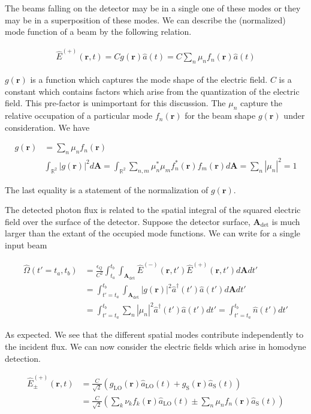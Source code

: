 \documentclass[12pt]{article}
\newcommand{\ep}{\epsilon}
\newcommand{\bv}[1]{\boldsymbol{#1}}
\begin{document}
The beams falling on the detector may be in a single one of these modes or they may be in a superposition of these modes. We can describe the (normalized) mode function of a beam by the following relation.

\begin{align}
\hat{E}^{(+)}(\bv{r},t) = C g(\bv{r})\hat{a}(t) = C \sum_{n} \mu_n f_n(\bv{r}) \hat{a}(t)	
\end{align}

$g(\bv{r})$ is a function which captures the mode shape of the electric field. $C$ is a constant which contains factors which arise from the quantization of the electric field. This pre-factor is unimportant for this discussion. The $\mu_n$ capture the relative occupation of a particular mode $f_n(\bv{r})$ for the beam shape $g(\bv{r})$ under consideration. We have

\begin{align}
g(\bv{r}) &= \sum_n \mu_n f_n(\bv{r})\\
& \int_{\mathbb{R}^2} |g(\bv{r})|^2 d\bv{A} = \int_{\mathbb{R}^2} \sum_{n,m} \mu_n^* \mu_m f_n^*(\bv{r})f_m(\bv{r})d\bv{A} = \sum_n |\mu_n|^2 = 1
\end{align}

The last equality is a statement of the normalization of $g(\bv{r})$.

The detected photon flux is related to the spatial integral of the squared electric field over the surface of the detector. Suppose the detector surface, $\bv{A}_{\text{det}}$ is much larger than the extant of the occupied mode functions. We can write for a single input beam

\begin{align}
\hat{\Omega}(t'=t_a,t_b) &= \frac{\ep_Q}{C^2} \int_{t_a}^{t_b} \int_{\bv{A}_{\text{det}}} \hat{E}^{(-)}(\bv{r},t')\hat{E}^{(+)}(\bv{r},t') d\bv{A} dt'\\
&= \int_{t'=t_a}^{t_b} \int_{\bv{A}_{\text{det}}} |g(\bv{r})|^2 \hat{a}^{\dag}(t')\hat{a}(t') d\bv{A} dt'\\
&= \int_{t'=t_a}^{t_b} \sum_n |\mu_n|^2 \hat{a}^{\dag}(t') \hat{a}(t') dt' = \int_{t'=t_a}^{t_b} \hat{n}(t') dt'
\end{align}

As expected. We see that the different spatial modes contribute independently to the incident flux. We can now consider the electric fields which arise in homodyne detection.

\begin{align}
\label{photonmodes}
\hat{E}^{(+)}_{\pm}(\bv{r},t) &= \frac{C}{\sqrt{2}}\left( g_{\text{LO}}(\bv{r}) \hat{a}_{\text{LO}}(t) + g_{\text{S}}(\bv{r}) \hat{a}_{\text{S}}(t)\right)\\
 &=\frac{C}{\sqrt{2}}\left(\sum_{k} \nu_k f_k(\bv{r}) \hat{a}_{\text{LO}}(t) \pm \sum_n \mu_n f_n(\bv{r}) \hat{a}_{\text{S}}(t) \right)
\end{align}
\end{document}
